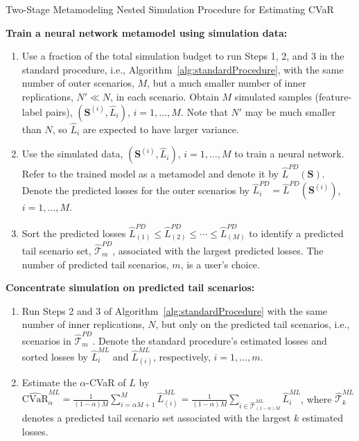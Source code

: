 \documentclass{article}
\newcommand{\CVaR}{\mbox{CVaR}}
\newcommand{\tail}{\mathcal{T}}
\newcommand{\bS}{\bm{S}}
\newcommand{\Lhat}{\widehat{L}}
\begin{document}
\begin{algorithm}
\caption{Two-Stage Metamodeling Nested Simulation Procedure for Estimating CVaR}
\begin{algorithmic}[1] \label{alg:twoStageProcedure}
    \STATE \textbf{Train a neural network metamodel using simulation data:}
    \begin{enumerate} [label=\alph*., itemsep=0pt, parsep=0pt, topsep=0pt]
        \item Use a fraction of the total simulation budget to run Steps 1, 2, and 3 in the standard procedure, i.e., Algorithm~\ref{alg:standardProcedure}, with the same number of outer scenarios, $M$, but a much smaller number of inner replications, $N' \ll N$, in each scenario. Obtain $M$ simulated samples (feature-label pairs), $(\bS^{(i)}, \Lhat_i)$, $i=1,\ldots,M$. Note that $N'$ may be much smaller than $N$, so $\Lhat_i$ are expected to have larger variance.
        \item Use the simulated data, $(\bS^{(i)}, \Lhat_i)$, $i=1,\ldots,M$ to train a neural network. Refer to the trained model as a metamodel and denote it by $\Lhat^{PD}(\bS)$. Denote the predicted losses for the outer scenarios by $\Lhat^{PD}_i = \Lhat^{PD}(\bS^{(i)})$, $i=1,\ldots,M$.
        \item Sort the predicted losses $\Lhat^{PD}_{(1)}\leq \Lhat^{PD}_{(2)} \leq \cdots\leq \Lhat^{PD}_{(M)}$ to identify a predicted tail scenario set, $\widehat{\tail}_{m}^{PD}$, associated with the largest predicted losses. The number of predicted tail scenarios, $m$, is a user's choice.
    \end{enumerate}
    \STATE \textbf{Concentrate simulation on predicted tail scenarios:}
    \begin{enumerate} [label=\alph*., itemsep=0pt, parsep=0pt, topsep=0pt]
        \item Run Steps 2 and 3 of Algorithm~\ref{alg:standardProcedure} with the same number of inner replications, $N$, but only on the predicted tail scenarios, i.e., scenarios in $\widehat{\tail}_{m}^{PD}$. Denote the standard procedure's estimated losses and sorted losses by $\Lhat^{ML}_i$ and $\Lhat^{ML}_{(i)}$, respectively, $i=1,\ldots,m$.
        \item Estimate the $\alpha$-CVaR of $L$ by $\widehat{\CVaR}^{ML}_\alpha = \frac{1}{(1-\alpha)M} \sum_{i=\alpha M + 1}^{M}\Lhat_{(i)}^{ML} = \frac{1}{(1-\alpha)M} \sum_{i \in \widehat{\tail}_{(1-\alpha )M}^{ML}}\Lhat_{i}^{ML}$, where $\widehat{\tail}_{k}^{ML}$ denotes a predicted tail scenario set associated with the largest $k$ estimated losses.
    \end{enumerate}
\end{algorithmic}
\end{algorithm}
\end{document}
